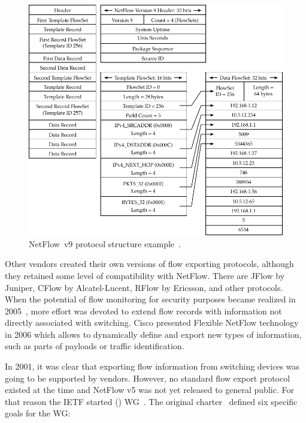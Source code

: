 \begin{figure}[t!]
  \begin{center}
    \includegraphics[width=\textwidth]{figures/nf9-protocol}
  \end{center}
  \caption{NetFlow~v9 protocol structure example~\cite{CiscoSystems-2007-NetFlow}.}
  \label{fig:nf9-protocol}
\end{figure}

Other vendors created their own versions of flow exporting protocols, although they retained some level of compatibility with NetFlow. There are JFlow by Juniper, CFlow by Alcatel-Lucent, RFlow by Ericsson, and other protocols. When the potential of flow monitoring for security purposes became realized in 2005~\cite{CiscoSystems-2005-Cisco}, more effort was devoted to extend flow records with information not directly associated with switching. Cisco presented Flexible NetFlow technology~\cite{CiscoSystems-2008-Cisco} in 2006 which allows to dynamically define and export new types of information, such as parts of payloads or traffic identification.

In 2001, it was clear that exporting flow information from switching devices was going to be supported by vendors. However, no standard flow export protocol existed at the time and NetFlow v5 was not yet released to general public. For that reason the IETF started  () WG~\cite{IETF--IP}. The original charter~\cite{IESG-2001-IP} defined six specific goals for the WG: 


